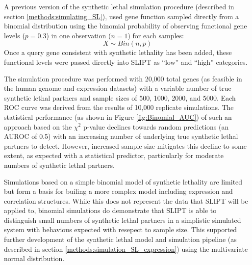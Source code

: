 A previous version of the synthetic lethal simulation procedure (described in section \ref{methods:simulating_SL}), used gene function sampled directly from a binomial distribution using the binomial probability of observing functional gene levels ($p = 0.3$) in one observation ($n = 1$) for each samples: $$X\sim Bin(n,p)$$  Once a query gene consistent with synthetic lethality has been added, these functional levels were passed directly into SLIPT as ``low'' and ``high'' categories.

The simulation procedure was performed with 20,000 total genes (as feasible in the human genome and expression datasets) with a variable number of true synthetic lethal partners and sample sizes of 500, 1000, 2000, and 5000. Each ROC curve was derived from the results of 10,000 replicate simulations. The statistical performance (as shown in Figure \ref{fig:Binomial_AUC}) of such an approach based on the $\chi^2$ p-value declines towards random predictions (an AUROC of 0.5) with an increasing number of underlying true synthetic lethal partners to detect. However, increased sample size mitigates this decline to some extent, as expected with a statistical predictor, particularly for moderate numbers of synthetic lethal partners. 

Simulations based on a simple binomial model of synthetic lethality are limited but form a basis for builing a more complex model including expression and correlation structures. While this does not represent the data that SLIPT will be applied to, binomial simulations do demonstrate that SLIPT is able to distinguish small numbers of synthetic lethal partners in a simplistic simulated system with behavious expected with resepect to sample size. This supported further development of the synthetic lethal model and simulation pipeline (as described in section \ref{methods:simulation_SL_expression}) using the multivariate normal distribution.

